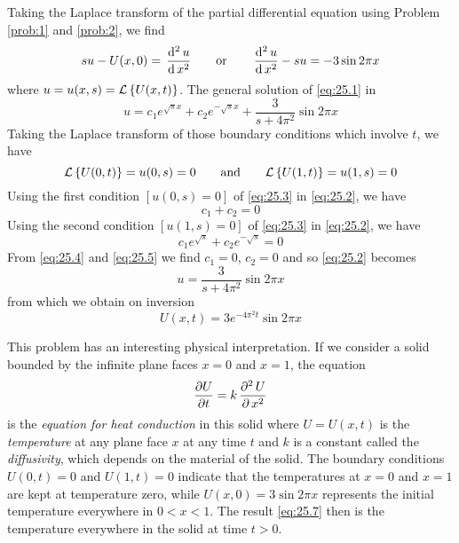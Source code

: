 \documentclass[../main-sheet.tex]{subfiles}
\begin{document}
\begin{soln}
    Taking the Laplace transform of the partial differential equation using Problem \ref{prob:1} and \ref{prob:2}, we find
    \begin{equation}
        \label{eq:25.1}
        su-U(x,0)=\,\frac{\mathrm{d}^{2}\, u}{\mathrm{d}\, x^{2}}\qquad\text{or}\qquad \,\frac{\mathrm{d}^{2}\, u}{\mathrm{d}\, x^{2}}-su=-3\sin 2\pi x
    \end{equation}
    where $ u=u(x,s)=\mathcal{L}\left\{ U(x,t)\right\} $. The general solution of \eqref{eq:25.1} in
    \begin{equation}
        \label{eq:25.2}
        u=c_1e^{\sqrt{s}x}+c_2e^{-\sqrt{s}x}+\frac{3}{s+4\pi^2}\sin 2\pi x
    \end{equation}
    Taking the Laplace transform of those boundary conditions which involve $ t $, we have
    \begin{equation}
        \label{eq:25.3}
        \mathcal{L}\left\{ U(0,t)\right\}=u(0,s)=0\qquad\text{and}\qquad \mathcal{L}\left\{ U(1,t)\right\}=u(1,s)=0
    \end{equation}
    Using the first condition $ [u(0,s)=0] $ of \eqref{eq:25.3} in \eqref{eq:25.2}, we have
    \begin{equation}
        \label{eq:25.4}
        c_1+c_2=0
    \end{equation}
    Using the second condition $ [u(1,s)=0] $ of \eqref{eq:25.3} in \eqref{eq:25.2}, we have
    \begin{equation}
        \label{eq:25.5}
        c_1e^{\sqrt{s}}+c_2e^{-\sqrt{s}}=0
    \end{equation}
    From \eqref{eq:25.4} and \eqref{eq:25.5} we find $ c_1=0 $, $ c_2=0 $ and so \eqref{eq:25.2} becomes
    \begin{equation}
        \label{eq:25.6}
        u=\frac{3}{s+4\pi^2} \sin2\pi x
    \end{equation}
    from which we obtain on inversion
    \begin{equation}
        \label{eq:25.7}
        U(x,t)=3e^{-4\pi^2 t}\sin 2\pi x
    \end{equation}

    This problem has an interesting physical interpretation. If we consider a solid bounded by the infinite plane faces $ x=0 $ and $ x=1 $, the equation
    \[
        \frac{\partial U}{\partial t}=k\,\frac{\partial^{2}\, U}{\partial\, x^{2}}
    \]
    is the \emph{equation for heat conduction} in this solid where $ U=U(x,t) $ is the \emph{temperature} at any plane face $ x $ at any time $ t $ and $ k $ is a constant called the \emph{diffusivity}, which depends on the material of the solid. The boundary conditions $U(0, t) = 0$ and $U (1, t) = 0$ indicate that the temperatures at $x = 0$ and $x = 1$ are kept at temperature zero, while $U(x, 0) = 3 \sin 2\pi x$ represents the initial temperature everywhere in $0 < x < 1$. The result \eqref{eq:25.7} then is the temperature everywhere in the solid at time $t > 0$.
\end{soln}
\end{document}
